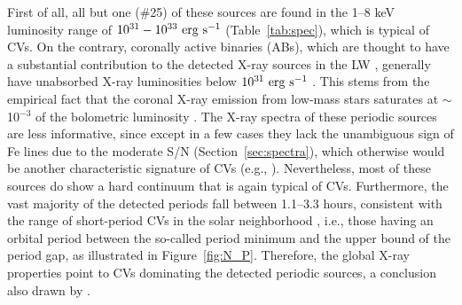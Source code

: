 \documentclass[fleqn,usenatbib]{mnras}
\begin{document}
First of all, all but one (\#25) of these sources are found in the 1--8 keV luminosity range of $10^{31}-10^{33}\rm~erg~s^{-1}$ (Table~\ref{tab:spec}), which is typical of CVs. 
On the contrary, coronally active binaries (ABs), which are thought to have a substantial contribution to the detected X-ray sources in the LW \citep{2009Natur.458.1142R}, generally have unabsorbed X-ray luminosities below $\rm 10^{31}~erg~s^{-1}$ \citep{2006A&A...450..117S}. 
This stems from the empirical fact that the coronal X-ray emission from low-mass stars saturates at $\sim$10$^{-3}$ of the bolometric luminosity \citep{2004A&ARv..12...71G}.
The X-ray spectra of these periodic sources are less informative, since except in a few cases they lack the unambiguous sign of Fe lines due to the moderate S/N (Section~\ref{sec:spectra}), which otherwise would be another characteristic signature of CVs (e.g., \citealp{2016ApJ...818..136X}).
Nevertheless, most of these sources do show a hard continuum that is again typical of CVs.
Furthermore, the vast majority of the detected periods fall between 1.1--3.3 hours, consistent with the range of short-period CVs in the solar neighborhood \citep{2003A&A...404..301R}, i.e., those having an orbital period between the so-called period minimum and the upper bound of the period gap, as illustrated in Figure~\ref{fig:N_P}. 
Therefore, the global X-ray properties point to CVs dominating the detected periodic sources, a conclusion also drawn by \cite{2012ApJ...746..165H}.
\end{document}
